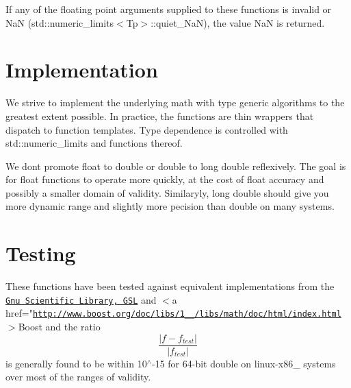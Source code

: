 If any of the floating point arguments supplied to these functions is invalid or NaN (std\+::numeric\+\_\+limits$<$\+Tp$>$\+::quiet\+\_\+\+NaN), the value NaN is returned.\hypertarget{index_impl}{}\section{Implementation}\label{index_impl}
We strive to implement the underlying math with type generic algorithms to the greatest extent possible. In practice, the functions are thin wrappers that dispatch to function templates. Type dependence is controlled with std\+::numeric\+\_\+limits and functions thereof.

We don\textquotesingle{}t promote {\ttfamily float} to {\ttfamily double} or {\ttfamily double} to {\ttfamily long double} reflexively. The goal is for {\ttfamily float} functions to operate more quickly, at the cost of {\ttfamily float} accuracy and possibly a smaller domain of validity. Similaryly, {\ttfamily long double} should give you more dynamic range and slightly more pecision than {\ttfamily double} on many systems.\hypertarget{index_testing}{}\section{Testing}\label{index_testing}
These functions have been tested against equivalent implementations from the \href{http://www.gnu.org/software/gsl}{\tt Gnu Scientific Library, G\+SL} and $<$a href="\href{http://www.boost.org/doc/libs/1_60_0/libs/math/doc/html/index.html}{\tt http\+://www.\+boost.\+org/doc/libs/1\+\_\+\_/libs/math/doc/html/index.\+html}$>$Boost and the ratio \[ \frac{|f - f_{test}|}{|f_{test}|} \] is generally found to be within 10$^\wedge$-\/15 for 64-\/bit double on linux-\/x86\+\_ systems over most of the ranges of validity.

